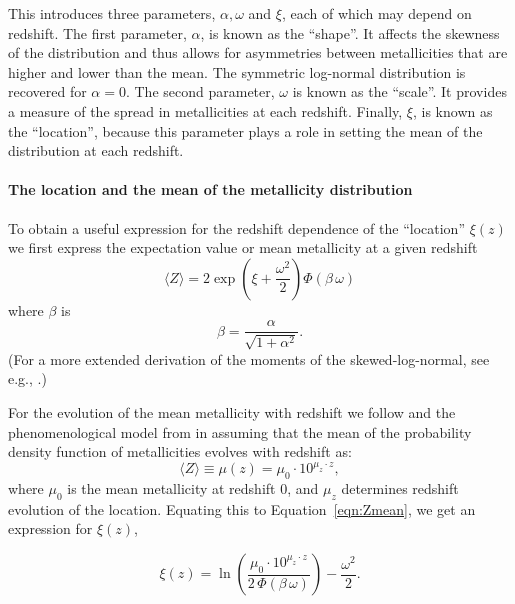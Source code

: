 \documentclass[twocolumn]{aastex631}
\begin{document}
%
\noindent This introduces three parameters, $\alpha, \omega$ and $\xi$, each of which may depend on redshift. The first parameter, $\alpha$, is known as the ``shape''. It affects the skewness of the distribution and thus allows for asymmetries between metallicities that are higher and lower than the mean.  The symmetric log-normal distribution is recovered for $\alpha=0$. The second parameter, $\omega$  is known as the ``scale''. It provides a measure of the spread in metallicities at each redshift.   Finally, $\xi$, is known as the ``location'', because this parameter plays a role in setting the mean of the distribution at each redshift.

\paragraph{The location and the mean of the metallicity distribution}
To obtain a useful expression for the redshift dependence of the ``location'' $\xi(z)$ we first express the expectation value or mean metallicity at a given redshift
\begin{equation}
 \langle  Z \rangle 
 = 2 \exp
        \left(\xi +  \frac{\omega^2}{2} \right)
         \Phi\left(\beta\, \omega\right)
 \label{eqn:Zmean}
\end{equation}
where $\beta$ is 
\begin{equation}
\label{eq: beta}
\beta = \frac{\alpha}{\sqrt{1 + \alpha^2} }.
\end{equation}
(For a more extended derivation of the moments of the skewed-log-normal, see e.g., \cite{WANG201995}.)

For the evolution of the mean metallicity with redshift we follow \cite{LangerNorman2006} and the phenomenological model from \cite{Neijssel+2019} in assuming that the mean of the probability density function of metallicities evolves with redshift as:
\begin{equation}
\label{eq: mean Z}
    \langle Z \rangle \equiv \mu(z) = \mu_0 \cdot 10^{\mu_z \cdot z},
\end{equation}
where $\mu_0
$ is the mean metallicity at redshift 0, and $\mu_z
$ determines redshift evolution of the location. Equating this to Equation~\ref{eqn:Zmean}, we get an expression for $\xi(z)$,


\begin{equation}
\label{eq mu z}
    \xi(z) = \ln\left(\frac{  \mu_0 \cdot 10^{\mu_z \cdot z} }{2\, \Phi(\beta\, \omega)}  \right) - \frac{\omega^2}{2}.
\end{equation}
\end{document}
